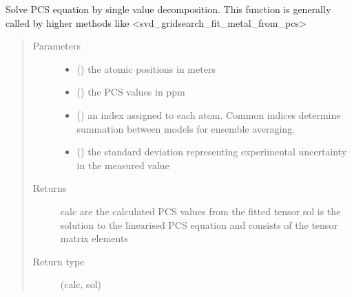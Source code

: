 \documentclass[a4paper,10pt,english,openany,oneside]{sphinxmanual}
\begin{document}
\begin{fulllineitems}
\label{\detokenize{reference/generated/paramagpy.fit.svd_calc_metal_from_pcs:paramagpy.fit.svd_calc_metal_from_pcs}}
Solve PCS equation by single value decomposition.
This function is generally called by higher methods like
\textless{}svd\_gridsearch\_fit\_metal\_from\_pcs\textgreater{}
\begin{quote}\begin{description}
\item[{Parameters}] \leavevmode\begin{itemize}
\item {} 
 (\sphinxstyleliteralemphasis{\sphinxupquote{ {[}}}\sphinxstyleliteralemphasis{\sphinxupquote{,}}\sphinxstyleliteralemphasis{\sphinxupquote{,}}\sphinxstyleliteralemphasis{\sphinxupquote{{]} }}) \textendash{} the atomic positions in meters

\item {} 
 () \textendash{} the PCS values in ppm

\item {} 
 () \textendash{} an index assigned to each atom. Common indices determine summation
between models for ensemble averaging.

\item {} 
 () \textendash{} the standard deviation representing experimental uncertainty
in the measured value

\end{itemize}

\item[{Returns}] \leavevmode
{} \textendash{} calc are the calculated PCS values from the fitted tensor
sol is the solution to the linearised PCS equation and
consists of the tensor matrix elements

\item[{Return type}] \leavevmode
(calc, sol)

\end{description}\end{quote}

\end{fulllineitems}
\end{document}
